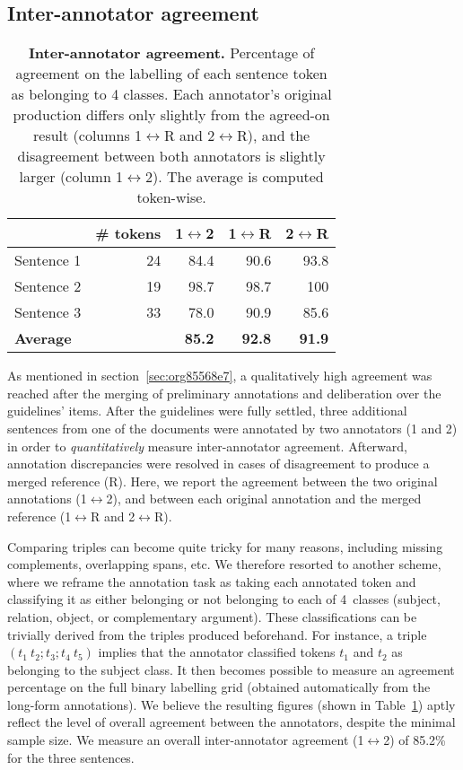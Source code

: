 \pdfoutput=1 \documentclass[11pt, a4paper]{article}
\begin{document}
\subsection{Inter-annotator agreement}

\begin{table}[hbt]
\centering
\begin{center}
\begin{tabular}{lrrrr}
 & \# tokens & 1$\leftrightarrow$2 & 1$\leftrightarrow$R & 2$\leftrightarrow$R\\
\hline
Sentence 1 & 24 & 84.4 & 90.6 & 93.8\\
Sentence 2 & 19 & 98.7 & 98.7 & 100\\
Sentence 3 & 33 & 78.0 & 90.9 & 85.6\\
\hline
\textbf{Average} &  & \textbf{85.2} & \textbf{92.8} & \textbf{91.9}\\
\end{tabular}
\end{center}
\caption{\label{tab:IAA}\textbf{Inter-annotator agreement.} Percentage of agreement on the labelling of each sentence token as belonging to 4 classes. Each annotator's original production differs only slightly from the agreed-on result (columns 1$\leftrightarrow$R and 2$\leftrightarrow$R), and the disagreement between both annotators is slightly larger (column 1$\leftrightarrow$2). The average is computed token-wise.}
\end{table}

As mentioned in section~\ref{sec:org85568e7}, a qualitatively high agreement was reached after the merging of preliminary annotations and deliberation over the guidelines' items. After the guidelines were fully settled, three additional sentences from one of the documents were annotated by two annotators (1 and 2) in order to \textit{quantitatively} measure inter-annotator agreement. 
Afterward, annotation discrepancies were resolved in cases of disagreement to produce a merged reference (R). 
Here, we report the agreement between the two original annotations (1$\leftrightarrow$2), and between each original annotation and the merged reference (1$\leftrightarrow$R and 2$\leftrightarrow$R). 

Comparing triples can become quite tricky for many reasons, including missing complements, overlapping spans, etc. We therefore resorted to another scheme, where we reframe the annotation task as taking each annotated token and classifying it as either belonging or not belonging to each of 4~classes (subject, relation, object, or complementary argument). These classifications can be trivially derived from the triples produced beforehand. For instance, a triple $(t_1~t_2;t_3;t_4~t_5)$ implies that the annotator classified tokens $t_1$ and $t_2$ as belonging to the subject class. It then becomes possible to measure an agreement percentage on the
full binary labelling grid (obtained automatically from the long-form annotations). We believe the resulting figures (shown in Table~\ref{tab:IAA}) aptly reflect the level of overall agreement between the annotators, despite the minimal sample size. We measure an overall inter-annotator agreement (1$\leftrightarrow$2) of 85.2\% for the three sentences.
\end{document}
